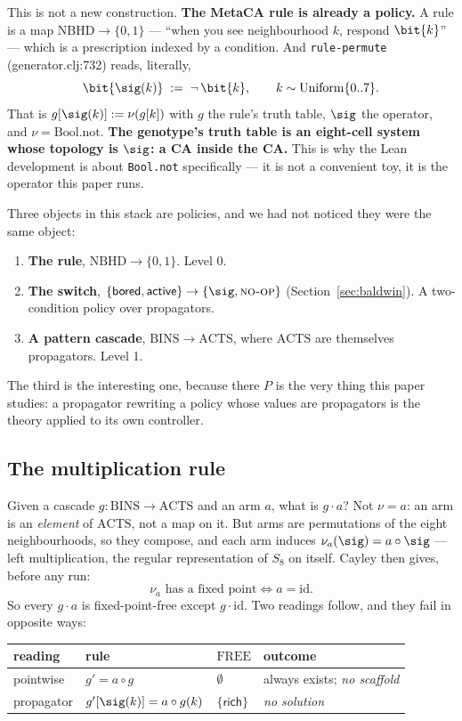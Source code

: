 This is not a new construction. \textbf{The MetaCA rule is already a policy.} A
rule is a map $\mathrm{NBHD} \to \{0,1\}$ --- ``when you see neighbourhood $k$,
respond $\bit{k}$'' --- which is a prescription indexed by a condition. And
\texttt{rule-permute} (generator.clj:732) reads, literally,
\[
  \bit{\sig(k)} \;:=\; \lnot\,\bit{k}, \qquad k \sim \mathrm{Uniform}\{0..7\}.
\]
That is $g[\sig(k)] := \nu(g[k])$ with $g$ the rule's truth table, $\sig$ the
operator, and $\nu = \mathrm{Bool.not}$. \textbf{The genotype's truth table is an
eight-cell system whose topology is $\sig$: a CA inside the CA.} This is why the
Lean development is about \texttt{Bool.not} specifically --- it is not a
convenient toy, it is the operator this paper runs.

Three objects in this stack are policies, and we had not noticed they were the
same object:
\begin{enumerate}
  \item \textbf{The rule}, $\mathrm{NBHD} \to \{0,1\}$. Level 0.
  \item \textbf{The switch}, $\{\textsf{bored}, \textsf{active}\} \to \{\sig,
        \textsc{no-op}\}$ (Section~\ref{sec:baldwin}). A two-condition policy over
        propagators.
  \item \textbf{A pattern cascade}, $\mathrm{BINS} \to \mathrm{ACTS}$, where
        $\mathrm{ACTS}$ are themselves propagators. Level 1.
\end{enumerate}
The third is the interesting one, because there $P$ is the very thing this paper
studies: a propagator rewriting a policy whose values are propagators is the
theory applied to its own controller.

\subsection{The multiplication rule}

Given a cascade $g : \mathrm{BINS} \to \mathrm{ACTS}$ and an arm $a$, what is
$g \cdot a$? Not $\nu = a$: an arm is an \emph{element} of $\mathrm{ACTS}$, not a
map on it. But arms are permutations of the eight neighbourhoods, so they compose,
and each arm induces $\nu_a(\sig) = a \circ \sig$ --- left multiplication, the
regular representation of $S_8$ on itself. Cayley then gives, before any run:
\[
  \nu_a \text{ has a fixed point} \iff a = \mathrm{id}.
\]
So every $g \cdot a$ is fixed-point-free except $g \cdot \mathrm{id}$. Two readings
follow, and they fail in opposite ways:
\begin{center}
\begin{tabular}{llll}
\toprule
reading & rule & $\mathrm{FREE}$ & outcome \\
\midrule
pointwise  & $g' = a \circ g$              & $\emptyset$ & always exists; \emph{no scaffold} \\
propagator & $g'[\sig(k)] = a \circ g(k)$  & $\{\textsf{rich}\}$ & \emph{no solution} \\
\bottomrule
\end{tabular}
\end{center}

